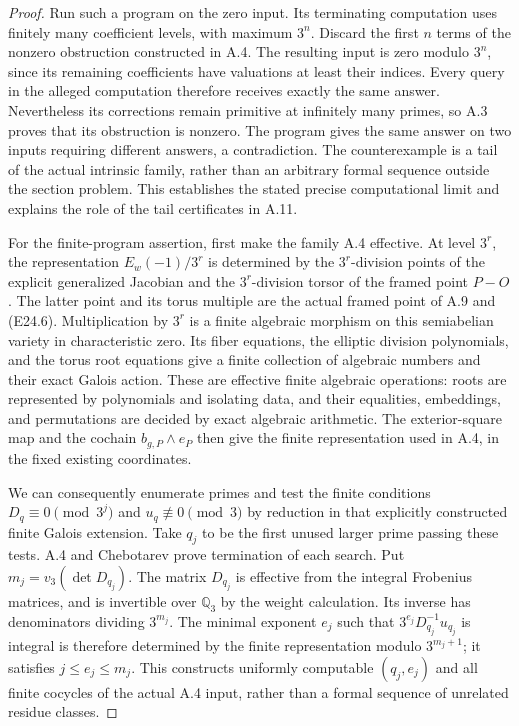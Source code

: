 \begin{proof}
Run such a program on the zero input. Its terminating computation
uses finitely many coefficient levels, with maximum $3^n$.
Discard the first $n$ terms of the nonzero obstruction constructed
in A.4. The resulting input is zero modulo $3^n$, since its
remaining coefficients have valuations at least their indices.
Every query in the alleged computation therefore receives exactly
the same answer. Nevertheless its corrections remain primitive at
infinitely many primes, so A.3 proves that its obstruction is
nonzero. The program gives the same answer on two inputs requiring
different answers, a contradiction. The counterexample is a tail
of the actual intrinsic family, rather than an arbitrary formal
sequence outside the section problem. This establishes the stated
precise computational limit and explains the role of the tail
certificates in A.11.

For the finite-program assertion, first make the family A.4
effective. At level $3^r$, the representation $E_w(-1)/3^r$
is determined by the $3^r$-division points of the explicit
generalized Jacobian and the $3^r$-division torsor of the
framed point $P-O$. The latter point and its torus multiple
are the actual framed point of A.9 and (E24.6).
Multiplication by $3^r$ is a finite algebraic morphism on
this semiabelian variety in characteristic zero. Its fiber
equations, the elliptic division polynomials, and the torus
root equations give a finite collection of algebraic numbers
and their exact Galois action. These are effective finite
algebraic operations: roots are represented by polynomials
and isolating data, and their equalities, embeddings, and
permutations are decided by exact algebraic arithmetic.
The exterior-square map and the cochain
$b_{g,P}\wedge e_P$ then give the finite representation
used in A.4, in the fixed existing coordinates.

We can consequently enumerate primes and test the finite
conditions $D_q\equiv0\pmod{3^j}$ and
$u_q\not\equiv0\pmod3$ by reduction in that explicitly
constructed finite Galois extension. Take $q_j$ to be the
first unused larger prime passing these tests. A.4 and
Chebotarev prove termination of each search. Put
$m_j=v_3(\det D_{q_j})$. The matrix $D_{q_j}$ is effective
from the integral Frobenius matrices, and is invertible
over $\mathbb Q_3$ by the weight calculation. Its inverse
has denominators dividing $3^{m_j}$. The minimal exponent
$e_j$ such that $3^{e_j}D_{q_j}^{-1}u_{q_j}$ is integral
is therefore determined by the finite representation
modulo $3^{m_j+1}$; it satisfies $j\le e_j\le m_j$.
This constructs uniformly computable $(q_j,e_j)$ and
all finite cocycles of the actual A.4 input, rather than
a formal sequence of unrelated residue classes.


\end{proof}
